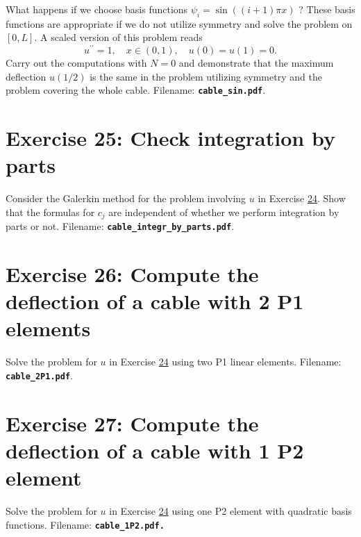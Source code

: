 \documentclass[../main.tex]{subfiles}
\begin{document}
		What happens if we choose basis functions $\psi_{i}=\sin ((i+1) \pi x)$ ? These basis functions are appropriate if we do not utilize symmetry and solve the problem on $[0, L]$. A scaled version of this problem reads
		$$
		u^{\prime \prime}=1, \quad x \in(0,1), \quad u(0)=u(1)=0 .
		$$
		Carry out the computations with $N=0$ and demonstrate that the maximum deflection $u(1 / 2)$ is the same in the problem utilizing symmetry and the problem covering the whole cable.
		Filename: \textbf{\texttt{cable\_sin.pdf}}. \bigbreak
	\section*{Exercise 25: Check integration by parts}
		Consider the Galerkin method for the problem involving $u$ in Exercise \hyperref[sec:sec_21_24]{24}. Show that the formulas for $c_{j}$ are independent of whether we perform integration by parts or not. Filename: \textbf{\texttt{cable\_integr\_by\_parts.pdf}}.\bigbreak
	\section*{Exercise 26: Compute the deflection of a cable with 2 P1 elements}
		Solve the problem for $u$ in Exercise \hyperref[sec:sec_21_24]{24} using two P1 linear elements. Filename: \textbf{\texttt{cable\_2P1.pdf}}.\bigbreak
	\section*{Exercise 27: Compute the deflection of a cable with 1 P2 element}
		Solve the problem for $u$ in Exercise \hyperref[sec:sec_21_24]{24} using one P2 element with quadratic basis functions. Filename: \textbf{\texttt{cable\_1P2.pdf.}} \bigbreak
\end{document}
